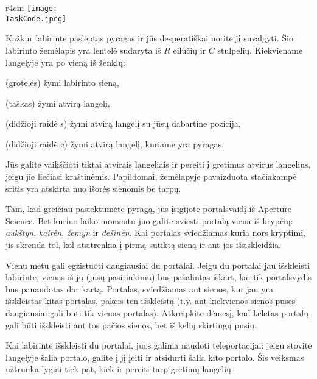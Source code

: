 \documentclass{boi2014-lt}
\renewcommand{\TaskCode}{portals}
\newcommand{\constant}[1]{{\tt #1}}
\begin{document}
    \begin{wrapfigure}[3]{r}{4cm}
        \vspace{-24pt}
		\texttt{[image: \\TaskCode.jpeg]}
	\end{wrapfigure}

    Kažkur labirinte paslėptas pyragas ir jūs desperatiškai norite jį suvalgyti.
    Šio labirinto žemėlapis yra lentelė sudaryta iš $R$ eilučių ir $C$ stulpelių.
    Kiekviename langelyje yra po vieną iš ženklų:
    \begin{description}[itemindent=1pt]
    	\item[\constant{\#}] (grotelės) žymi labirinto sieną,
        \item[\constant{.}] (taškas) žymi atvirą langelį,
        \item[\constant{S}] (didžioji raidė s) žymi atvirą langelį su jūsų
            dabartine pozicija,
        \item[\constant{C}] (didžioji raidė c) žymi atvirą langelį, kuriame yra
            pyragas.
    \end{description}

    Jūs galite vaikščioti tiktai atvirais langeliais ir pereiti į gretimus
    atvirus langelius, jeigu jie liečiasi kraštinėmis. Papildomai, žemėlapyje
    pavaizduota stačiakampė sritis yra atskirta nuo išorės sienomis be tarpų.

    Tam, kad greičiau pasiektumėte pyragą, jūs įsigijote portalsvaidį iš
    Aperture Science\texttrademark{}. Bet kuriuo laiko momentu juo galite sviesti
    portalą viena iš krypčių: \emph{aukštyn}, \emph{kairėn}, \emph{žemyn} ir
    \emph{dešinėn}. Kai portalas sviedžiamas kuria nors kryptimi, jis skrenda
    tol, kol atsitrenkia į pirmą sutiktą sieną ir ant jos išsiskleidžia.

    Vienu metu gali egzistuoti daugiausiai du portalai. Jeigu du portalai jau
    išskleisti labirinte, vienas iš jų (jūsų pasirinkimu) bus pašalintas iškart,
    kai tik portalsvydis bus panaudotas dar kartą. Portalas, sviedžiamas ant
    sienos, kur jau yra išskleistas kitas portalas, pakeis ten išskleistą
    (t.y. ant kiekvienos sienos pusės daugiausiai gali būti tik vienas portalas).
    Atkreipkite dėmesį, kad keletas portalų gali būti išskleisti ant tos pačios
    sienos, bet iš kelių skirtingų pusių.

    Kai labirinte išskleisti du portalai, juos galima naudoti teleportacijai:
    jeigu stovite langelyje šalia portalo, galite į jį įeiti ir atsidurti šalia
    kito portalo. Šis veiksmas užtrunka lygiai tiek pat, kiek ir pereiti tarp
    gretimų langelių.
\end{document}
